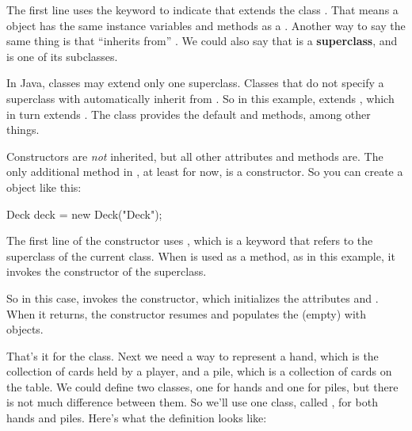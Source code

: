 
The first line uses the keyword  to indicate that  extends the class .
That means a  object has the same instance variables and methods as a .
Another way to say the same thing is that  ``inherits from'' .
We could also say that  is a {\bf superclass}, and  is one of its subclasses.



In Java, classes may extend only one superclass.
Classes that do not specify a superclass with  automatically inherit from .
So in this example,  extends , which in turn extends .
The  class provides the default  and  methods, among other things.


Constructors are {\em not} inherited, but all other  attributes and methods are.
The only additional method in , at least for now, is a constructor.
So you can create a  object like this:

\begin{code}
Deck deck = new Deck("Deck");
\end{code}

The first line of the constructor uses , which is a keyword that refers to the superclass of the current class.
When  is used as a method, as in this example, it invokes the constructor of the superclass.


So in this case,  invokes the  constructor, which initializes the attributes  and .
When it returns, the  constructor resumes and populates the (empty)  with  objects.

That's it for the  class.
Next we need a way to represent a hand, which is the collection of cards held by a player, and a pile, which is a collection of cards on the table.
We could define two classes, one for hands and one for piles, but there is not much difference between them.
So we'll use one class, called , for both hands and piles.
Here's what the definition looks like:

